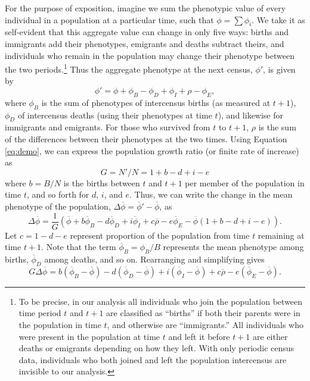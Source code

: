 For the purpose of exposition, imagine we sum the phenotypic value of every individual in a population at a particular time, such that $\phi = \sum \phi_i$.  We take it as self-evident that this aggregate value can change in only five ways: births and immigrants add their phenotypes, emigrants and deaths subtract theirs, and individuals who remain in the population may change their phenotype between the two periods.\footnote{To be precise, in our analysis all individuals who join the population between time period $t$ and $t+1$ are classified as ``births'' if both their parents were in the population in time $t$, and otherwise are ``immigrants.''  All individuals who were present in the population at time $t$ and left it before $t+1$ are either deaths or emigrants depending on how they left.  With only periodic census data, individuals who both joined and left the population intercensus are invisible to our analysis.}  Thus the aggregate phenotype at the next census, $\phi'$, is given by
	\[\phi' = \phi + \phi_B - \phi_D  + \phi_I + \rho - \phi_E, 
\]
where $\phi_B$ is the sum of phenotypes of intercensus births (as measured at $t+1$), $\phi_D$ of intercensus deaths (using their phenotypes at time $t$), and likewise for immigrants and emigrants.  For those who survived from $t$ to $t+1$, $\rho$ is the sum of the differences between their phenotypes at the two times.  Using Equation \ref{eq:demo}, we can express the population growth ratio (or finite rate of increase) as 
	\[G = N'/N  = 1 + b - d + i - e
\]
where $b=B/N$ is the births between $t$ and $t+1$ per member of the population in time $t$, and so forth for $d$, $i$, and $e$.  Thus, we can write the change in the mean phenotype of the population, $\Delta \overline{\phi} = \overline{\phi}' - \overline{\phi}$, as
	\[\Delta \overline{\phi} = \frac{1}{G}\left(\overline{\phi} + b\overline{\phi}_B - d\overline{\phi}_D + i\overline{\phi}_I + c\overline{\rho} - e\overline{\phi}_E - \overline{\phi}(1 + b - d + i - e)\right).
\]
Let $c=1-d-e$ represent proportion of the population from time $t$ remaining at time $t+1$.  Note that the term $\overline{\phi}_B= \phi_B/B$ represents the mean phenotype among births, $\overline{\phi}_D$ among deaths, and so on.  Rearranging and simplifying gives 
\begin{equation} \label{eq:BDICE}
G \Delta \overline{\phi} =  b(\overline{\phi}_B - \overline{\phi}) - d(\overline{\phi}_D - \overline{\phi}) + i(\overline{\phi}_I - \overline{\phi}) + c \overline{\rho} - e(\overline{\phi}_E - \overline{\phi}).
\end{equation}

